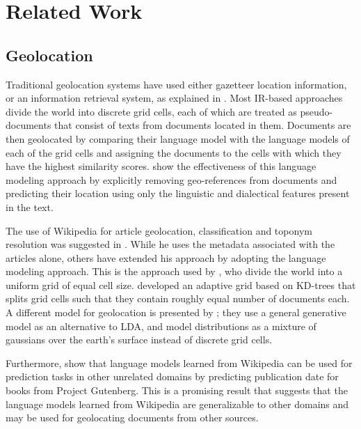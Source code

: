 \section{Related Work}
\subsection{Geolocation}
Traditional geolocation systems have used either gazetteer location information, or an information retrieval system, as explained in \cite{skiles:12}.
Most IR-based approaches divide the world into discrete grid cells, each of which are treated as pseudo-documents that consist of texts from documents located in them.
Documents are then geolocated by comparing their language model with the language models of each of the grid cells and assigning the documents to the cells with which they have the highest similarity scores.
\cite{eisenstein-smith-xing:11} show the effectiveness of this language modeling approach by explicitly removing geo-references from documents and predicting their location using only the linguistic and dialectical features present in the text.

The use of Wikipedia for article geolocation, classification and toponym resolution was suggested in \cite{overell2009geographic}.
While he uses the metadata associated with the articles alone, others have extended his approach by adopting the language modeling approach. 
This is the approach used by \cite{wing-baldridge:11}, who divide the world into a uniform grid of equal cell size.
\cite{rolleretal:12} developed an adaptive grid based on KD-trees that splits grid cells such that they contain roughly equal number of documents each.
A different model for geolocation is presented by \cite{eisensteinetal:11}; they use a general generative model as an alternative to LDA, and model distributions as a mixture of gaussians over the earth's surface instead of discrete grid cells. 

Furthermore, \cite{kumar-et-al:11} show that language models learned from Wikipedia can be used for prediction tasks in other unrelated domains by predicting publication date for books from Project Gutenberg.
This is a promising result that suggests that the language models learned from Wikipedia are generalizable to other domains and may be used for geolocating documents from other sources. 

